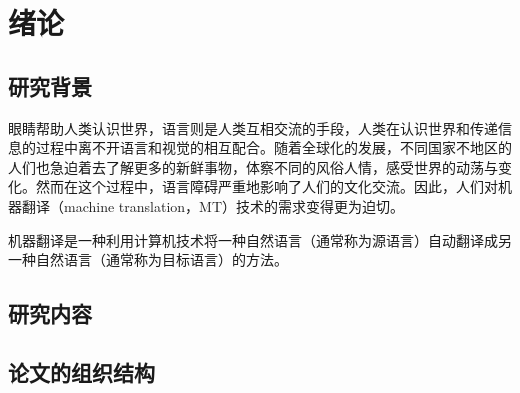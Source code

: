 \chapter{绪论}

\section{研究背景}

眼睛帮助人类认识世界，语言则是人类互相交流的手段，人类在认识世界和传递信息的过程中离不开语言和视觉的相互配合。随着全球化的发展，不同国家不地区的人们也急迫着去了解更多的新鲜事物，体察不同的风俗人情，感受世界的动荡与变化。然而在这个过程中，语言障碍严重地影响了人们的文化交流。因此，人们对机器翻译（machine translation，MT）技术的需求变得更为迫切。

机器翻译是一种利用计算机技术将一种自然语言（通常称为源语言）自动翻译成另一种自然语言（通常称为目标语言）的方法\cite{zong2013}。

\section{研究内容}

\section{论文的组织结构}